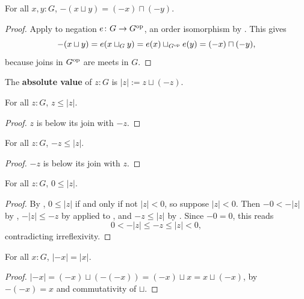 \begin{corollary}[\agda{-⊔}]
  \label{negJoin}
  For all $x, y : G$, $-(x \sqcup y) = (-x) \sqcap (-y)$.
\end{corollary}
\begin{proof}
  Apply  to negation $e \colon G \to G^{\mathrm{op}}$, an order isomorphism by . This gives
  \[
    -(x \sqcup y) = e(x \sqcup_{G} y) = e(x) \sqcup_{G^{\mathrm{op}}} e(y) = (-x) \sqcap (-y),
  \]
  because joins in $G^{\mathrm{op}}$ are meets in $G$.
\end{proof}

\begin{definition}
  \label{abs}
  The \textbf{absolute value} of $z : G$ is $\lvert z \rvert := z \sqcup (-z)$.
\end{definition}

\begin{lemma}
  \label{leAbs}
  For all $z : G$, $z \le \lvert z \rvert$.
\end{lemma}
\begin{proof}
  $z$ is below its join with $-z$.
\end{proof}

\begin{lemma}
  \label{negLeAbs}
  For all $z : G$, $-z \le \lvert z \rvert$.
\end{lemma}
\begin{proof}
  $-z$ is below its join with $z$.
\end{proof}

\begin{lemma}
  \label{absNonNeg}
  For all $z : G$, $0 \le \lvert z \rvert$.
\end{lemma}
\begin{proof}
  By , $0 \le \lvert z \rvert$ if and only if not $\lvert z \rvert < 0$, so suppose $\lvert z \rvert < 0$. Then $-0 < -\lvert z \rvert$ by , $-\lvert z \rvert \le -z$ by  applied to , and $-z \le \lvert z \rvert$ by . Since $-0 = 0$, this reads
  \[
    0 < -\lvert z \rvert \le -z \le \lvert z \rvert < 0,
  \]
  contradicting irreflexivity.
\end{proof}

\begin{lemma}
  \label{absNeg}
  For all $x : G$, $\lvert -x \rvert = \lvert x \rvert$.
\end{lemma}
\begin{proof}
  $\lvert -x \rvert = (-x) \sqcup (-(-x)) = (-x) \sqcup x = x \sqcup (-x)$, by $-(-x) = x$ and commutativity of $\sqcup$.
\end{proof}

